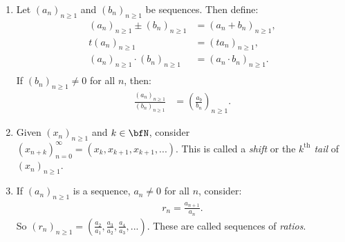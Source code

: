     \begin{example}
        \phantom{a}
        \begin{enumerate}[label = (\arabic*)]
            \item Let $(a_n)_{n\geq 1}$ and $(b_n)_{n \geq 1}$ be sequences. Then define:
                \begin{equation*}
                \begin{split}
                    (a_n)_{n\geq 1} \pm (b_n)_{n\geq 1} &= (a_n+b_n)_{n\geq 1}, \\
                    t(a_n)_{n\geq 1} &= (ta_n)_{n\geq 1}, \\
                    (a_n)_{n\geq 1}\cdot (b_n)_{n\geq 1} &= (a_n\cdot b_n)_{n\geq 1}. \\
                \end{split}
                \end{equation*}
            If $(b_n)_{n\geq 1} \neq 0$ for all $n$, then:
                \begin{equation*}
                \begin{split}
                    \frac{(a_n)_{n\geq 1}}{(b_n)_{n\geq 1}} & = \left(\frac{a_b}{b_n}\right)_{n\geq 1}.
                \end{split}
                \end{equation*}

            \item Given $(x_n)_{n \geq 1}$ and $k \in \bfN$, consider $(x_{n+k})_{n=0}^\infty = (x_k,x_{k+1},x_{k+1},...)$. This is called a \textit{shift} or the \textit{$k^{\text{th}}$ tail} of $(x_n)_{n \geq 1}$.
            
            \item If $(a_n)_{n \geq 1}$ is a sequence, $a_n \neq 0$ for all $n$, consider:
                \begin{equation*}
                \begin{split}
                    r_n = \frac{a_{n+1}}{a_n}.
                \end{split}
                \end{equation*}
            So $(r_n)_{n \geq 1} = \left(\frac{a_2}{a_1},\frac{a_3}{a_2},\frac{a_4}{a_3},...\right)$. These are called sequences of \textit{ratios}.


\end{enumerate}
\end{example}
